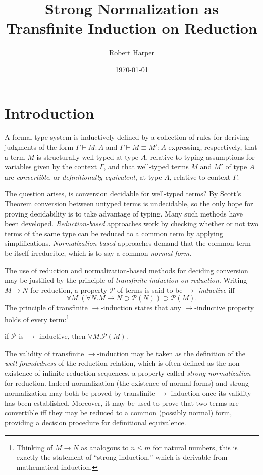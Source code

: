 \documentclass[11pt,twoside]{article}
\begin{document}
\title{Strong Normalization as Transfinite Induction on Reduction}
\author{Robert Harper}
\date{\today}

\maketitle{}

\section{Introduction}

A formal type system is inductively defined by a collection of rules for deriving
judgments of the form $\Gamma\vdash M:A$ and $\Gamma\vdash M\equiv M':A$ expressing, respectively, that a term
$M$ is structurally well-typed at type $A$, relative to typing assumptions for variables
given by the context $\Gamma$, and that well-typed terms $M$ and $M'$ of type $A$ are
\emph{convertible}, or \emph{definitionally equivalent}, at type $A$, relative to context
$\Gamma$.

The question arises, is conversion decidable for well-typed terms?  By Scott's Theorem
conversion between untyped terms is undecidable, so the only hope for proving decidability
is to take advantage of typing.  Many such methods have been developed.
\emph{Reduction-based} approaches work by checking whether or not two terms of the same
type can be reduced to a common term by applying simplifications.
\emph{Normalization-based} approaches demand that the common term be itself irreducible,
which is to say a common \emph{normal form}.

The use of reduction and normalization-based methods for deciding conversion may be
justified by the principle of \emph{transfinite induction on reduction}.  Writing $M\to N$
for reduction, a property $\mathcal{P}$ of terms is said to be \emph{$\to$-inductive} iff
\begin{displaymath}
  \forall M.(\forall N.M\to N\supset\mathcal{P}(N))\supset\mathcal{P}(M).
\end{displaymath}
The principle of transfinite $\to$-induction states that any $\to$-inductive property holds of
every term:\footnote{Thinking of $M\to N$ as analogous to $n\leq m$ for natural numbers, this
  is exactly the statement of ``strong induction,'' which is derivable from mathematical
  induction.}
\begin{center}
  if $\mathcal{P}$ is $\to$-inductive, then $\forall M.\mathcal{P}(M)$.
\end{center}
The validity of transfinite $\to$-induction may be taken as the definition of the
\emph{well-foundedness} of the reduction relation, which is often defined as the
non-existence of infinite reduction sequences, a property called \emph{strong
  normalization} for reduction.  Indeed normalization (the existence of normal forms) and
strong normalization may both be proved by transfinite $\to$-induction once its validity has
been established.  Moreover, it may be used to prove that two terms are convertible iff
they may be reduced to a common (possibly normal) form, providing a decision procedure for
definitional equivalence.
\end{document}
